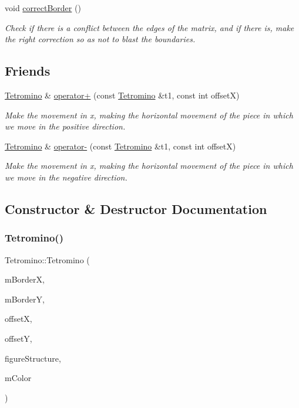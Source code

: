 \begin{DoxyCompactItemize}
\mbox{\label{classTetromino_a28d82770c123148f13468456a4508353}} 
void \hyperlink{classTetromino_a28d82770c123148f13468456a4508353}{correct\+Border} ()
\begin{DoxyCompactList}\small\item\em Check if there is a conflict between the edges of the matrix, and if there is, make the right correction so as not to blast the boundaries. \end{DoxyCompactList}\end{DoxyCompactItemize}
\subsection*{Friends}
\begin{DoxyCompactItemize}
\item 
\hyperlink{classTetromino}{Tetromino} \& \hyperlink{classTetromino_a6df1d7b28f8b0b41027018105153cc42}{operator+} (const \hyperlink{classTetromino}{Tetromino} \&t1, const int offsetX)
\begin{DoxyCompactList}\small\item\em Make the movement in x, making the horizontal movement of the piece in which we move in the positive direction. \end{DoxyCompactList}\item 
\hyperlink{classTetromino}{Tetromino} \& \hyperlink{classTetromino_ac382287ca988f74d5a2e517224a1dfd4}{operator-\/} (const \hyperlink{classTetromino}{Tetromino} \&t1, const int offsetX)
\begin{DoxyCompactList}\small\item\em Make the movement in x, making the horizontal movement of the piece in which we move in the negative direction. \end{DoxyCompactList}\end{DoxyCompactItemize}


\subsection{Constructor \& Destructor Documentation}
\mbox{\label{classTetromino_ab2a8b2460d6acaf098cdc257630cd182}} 
\subsubsection{\texorpdfstring{Tetromino()}{Tetromino()}}
{\footnotesize\ttfamily Tetromino\+::\+Tetromino (\begin{DoxyParamCaption}\item[{int}]{m\+BorderX,  }\item[{int}]{m\+BorderY,  }\item[{int}]{offsetX,  }\item[{int}]{offsetY,  }\item[{std\+::vector$<$ sf\+::\+Vector2i $>$}]{figure\+Structure,  }\item[{Available\+Colors}]{m\+Color }\end{DoxyParamCaption})}

